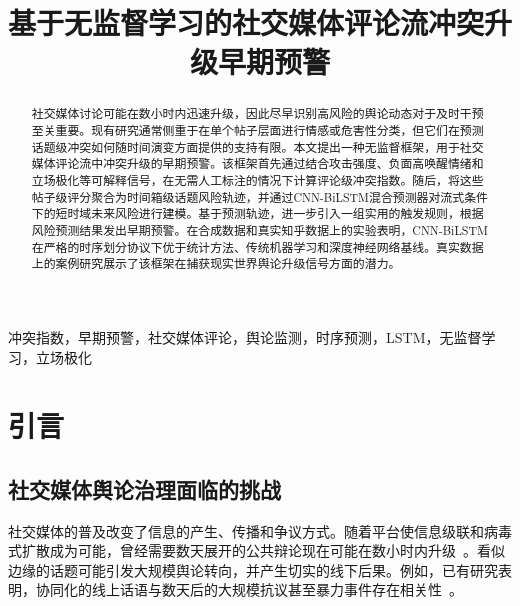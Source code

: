 \documentclass[conference]{IEEEtran}
\begin{document}
\title{基于无监督学习的社交媒体评论流冲突升级早期预警}

\author{
}
\maketitle

\begin{abstract}
社交媒体讨论可能在数小时内迅速升级，因此尽早识别高风险的舆论动态对于及时干预至关重要。现有研究通常侧重于在单个帖子层面进行情感或危害性分类，但它们在预测话题级冲突如何随时间演变方面提供的支持有限。本文提出一种无监督框架，用于社交媒体评论流中冲突升级的早期预警。该框架首先通过结合攻击强度、负面高唤醒情绪和立场极化等可解释信号，在无需人工标注的情况下计算评论级冲突指数。随后，将这些帖子级评分聚合为时间箱级话题风险轨迹，并通过CNN-BiLSTM混合预测器对流式条件下的短时域未来风险进行建模。基于预测轨迹，进一步引入一组实用的触发规则，根据风险预测结果发出早期预警。在合成数据和真实知乎数据上的实验表明，CNN-BiLSTM在严格的时序划分协议下优于统计方法、传统机器学习和深度神经网络基线。真实数据上的案例研究展示了该框架在捕获现实世界舆论升级信号方面的潜力。
\end{abstract}

\begin{IEEEkeywords}
冲突指数，早期预警，社交媒体评论，舆论监测，时序预测，LSTM，无监督学习，立场极化
\end{IEEEkeywords}

\section{引言}

\subsection{社交媒体舆论治理面临的挑战}

社交媒体的普及改变了信息的产生、传播和争议方式。随着平台使信息级联和病毒式扩散成为可能，曾经需要数天展开的公共辩论现在可能在数小时内升级~\cite{Vosoughi2018}。看似边缘的话题可能引发大规模舆论转向，并产生切实的线下后果。例如，已有研究表明，协同化的线上话语与数天后的大规模抗议甚至暴力事件存在相关性~\cite{Steinert2015,Arcila2024}。
\end{document}
